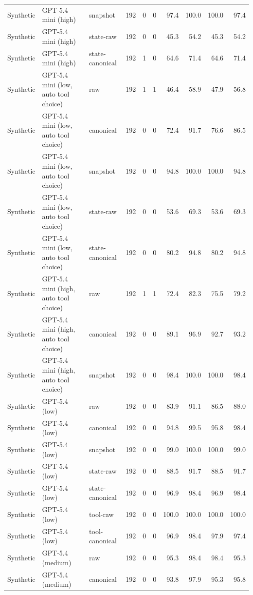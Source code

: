 {\begin{longtable}{lllrrrrrrr}
Synthetic & GPT-5.4 mini (high) & snapshot & 192 & 0 & 0 & 97.4 & 100.0 & 100.0 & 97.4 \\
Synthetic & GPT-5.4 mini (high) & state-raw & 192 & 0 & 0 & 45.3 & 54.2 & 45.3 & 54.2 \\
Synthetic & GPT-5.4 mini (high) & state-canonical & 192 & 1 & 0 & 64.6 & 71.4 & 64.6 & 71.4 \\
Synthetic & GPT-5.4 mini (low, auto tool choice) & raw & 192 & 1 & 1 & 46.4 & 58.9 & 47.9 & 56.8 \\
Synthetic & GPT-5.4 mini (low, auto tool choice) & canonical & 192 & 0 & 0 & 72.4 & 91.7 & 76.6 & 86.5 \\
Synthetic & GPT-5.4 mini (low, auto tool choice) & snapshot & 192 & 0 & 0 & 94.8 & 100.0 & 100.0 & 94.8 \\
Synthetic & GPT-5.4 mini (low, auto tool choice) & state-raw & 192 & 0 & 0 & 53.6 & 69.3 & 53.6 & 69.3 \\
Synthetic & GPT-5.4 mini (low, auto tool choice) & state-canonical & 192 & 0 & 0 & 80.2 & 94.8 & 80.2 & 94.8 \\
Synthetic & GPT-5.4 mini (high, auto tool choice) & raw & 192 & 1 & 1 & 72.4 & 82.3 & 75.5 & 79.2 \\
Synthetic & GPT-5.4 mini (high, auto tool choice) & canonical & 192 & 0 & 0 & 89.1 & 96.9 & 92.7 & 93.2 \\
Synthetic & GPT-5.4 mini (high, auto tool choice) & snapshot & 192 & 0 & 0 & 98.4 & 100.0 & 100.0 & 98.4 \\
Synthetic & GPT-5.4 (low) & raw & 192 & 0 & 0 & 83.9 & 91.1 & 86.5 & 88.0 \\
Synthetic & GPT-5.4 (low) & canonical & 192 & 0 & 0 & 94.8 & 99.5 & 95.8 & 98.4 \\
Synthetic & GPT-5.4 (low) & snapshot & 192 & 0 & 0 & 99.0 & 100.0 & 100.0 & 99.0 \\
Synthetic & GPT-5.4 (low) & state-raw & 192 & 0 & 0 & 88.5 & 91.7 & 88.5 & 91.7 \\
Synthetic & GPT-5.4 (low) & state-canonical & 192 & 0 & 0 & 96.9 & 98.4 & 96.9 & 98.4 \\
Synthetic & GPT-5.4 (low) & tool-raw & 192 & 0 & 0 & 100.0 & 100.0 & 100.0 & 100.0 \\
Synthetic & GPT-5.4 (low) & tool-canonical & 192 & 0 & 0 & 96.9 & 98.4 & 97.9 & 97.4 \\
Synthetic & GPT-5.4 (medium) & raw & 192 & 0 & 0 & 95.3 & 98.4 & 98.4 & 95.3 \\
Synthetic & GPT-5.4 (medium) & canonical & 192 & 0 & 0 & 93.8 & 97.9 & 95.3 & 95.8 \\

\end{longtable}}
